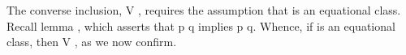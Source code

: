 \begin{code}
\AgdaSpace{}%
\AgdaSpace{}%
\AgdaSpace{}%
\AgdaSymbol{)}\<%
\\
%
\>[2]\AgdaSpace{}%
\AgdaSymbol{=}\AgdaSpace{}%
\AgdaSpace{}%
\AgdaSymbol{(}\AgdaSpace{}%
\AgdaOperator{\AgdaInductiveConstructor{,}}\AgdaSpace{}%
\AgdaSpace{}%
\AgdaSymbol{)}\AgdaSpace{}%
\AgdaSymbol{(}\AgdaSpace{}%
\AgdaOperator{\AgdaInductiveConstructor{,}}\AgdaSpace{}%
\AgdaSpace{}%
\AgdaSymbol{)}\AgdaSpace{}%
\AgdaSpace{}%
\AgdaBound{\AgdaUnderscore{}}\AgdaSpace{}%
\AgdaBound{\AgdaUnderscore{}}\AgdaSpace{}%
\AgdaSpace{}%
\AgdaSymbol{)}\AgdaSpace{}%
\AgdaSpace{}%
\AgdaBound{\AgdaUnderscore{}}\AgdaSpace{}%
\AgdaSpace{}%
\AgdaSymbol{)}\<%
\\
\>[0]\<%
\end{code}

The converse inclusion, \af V   , requires the assumption
that  is an equational class. Recall lemma
, which asserts that   \ab p  \ab q implies 
    \ab p  \ab q. Whence, if  is an equational
class, then \af V   , as we now confirm.

